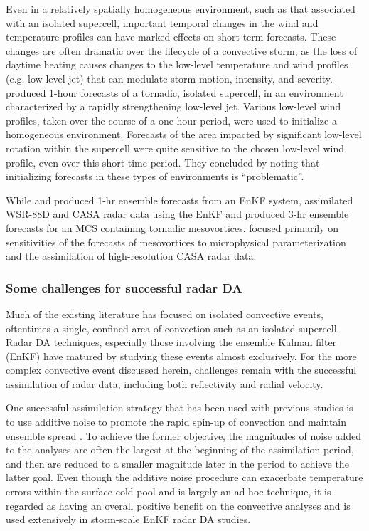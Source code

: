 Even in a relatively spatially homogeneous environment, such as that associated with an isolated supercell, important temporal changes in the wind and temperature profiles can have marked effects on short-term forecasts. These changes are often dramatic over the lifecycle of a convective storm, as the loss of daytime heating causes changes to the low-level temperature and wind profiles (e.g. low-level jet) that can modulate storm motion, intensity, and severity. \citet{dawsonetal12} produced 1-hour forecasts of a tornadic, isolated supercell, in an environment characterized by a rapidly strengthening low-level jet. Various low-level wind profiles, taken over the course of a one-hour period, were used to initialize a homogeneous environment. Forecasts of the area impacted by significant low-level rotation within the supercell were quite sensitive to the chosen low-level wind profile, even over this short time period. They concluded by noting that initializing forecasts in these types of environments is “problematic”.
	
While \citet{aksoyetal10} and \citet{dawsonetal12} produced 1-hr ensemble forecasts from an EnKF system, \citet{snooketal12} assimilated WSR-88D and CASA radar data using the EnKF and produced 3-hr ensemble forecasts for an MCS containing tornadic mesovortices. \citet{snooketal12} focused primarily on sensitivities of the forecasts of mesovortices to microphysical parameterization and the assimilation of high-resolution CASA radar data.

\subsubsection{Some challenges for successful radar DA}
Much of the existing literature has focused on isolated convective events, oftentimes a single, confined area of convection such as an isolated supercell. Radar DA techniques, especially those involving the ensemble Kalman filter (EnKF) have matured by studying these events almost exclusively. For the more complex convective event discussed herein, challenges remain with the successful assimilation of radar data, including both reflectivity and radial velocity.

One successful assimilation strategy that has been used with previous studies is to use additive noise to promote the rapid spin-up of convection and maintain ensemble spread \citep{dowellwicker09}. To achieve the former objective, the magnitudes of noise added to the analyses are often the largest at the beginning of the assimilation period, and then are reduced to a smaller magnitude later in the period to achieve the latter goal. Even though the additive noise procedure can exacerbate temperature errors within the surface cold pool and is largely an ad hoc technique, it is regarded as having an overall positive benefit on the convective analyses \citep{dowelletal11} and is used extensively in storm-scale EnKF radar DA studies.

